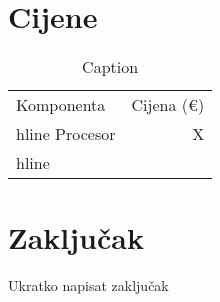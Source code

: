 \documentclass{article}
\begin{document}
\section{Cijene}
    \begin{table}[H]
        \centering
        \begin{tabular}{|l|r|}
            \hline
            Komponenta & Cijena (€)\\hline
            Procesor & X\\hline
        \end{tabular}
        \caption{Caption}
        \label{tab:my_label}
    \end{table}
\clearpage

\section{Zaključak}
Ukratko napisat zaključak
\clearpage

\listoffigures
\end{document}
